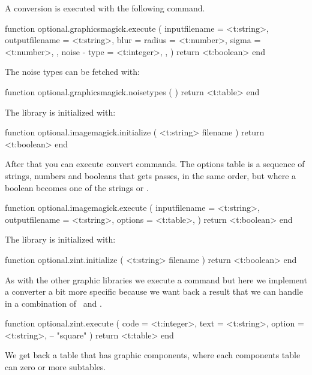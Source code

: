 A conversion is executed with the following command.

\starttyping[option=LUA]
function optional.graphicsmagick.execute (
    {
        inputfilename  = <t:string>,
        outputfilename = <t:string>,
        blur           = {
            radius = <t:number>,
            sigma  = <t:number>,
        },
        noise          - {
            type   = <t:integer>,
        },
    }
)
    return <t:boolean>
end
\stoptyping

The noise types can be fetched with:

\starttyping[option=LUA]
function optional.graphicsmagick.noisetypes ( )
    return <t:table>
end
\stoptyping

\stopsubsubsubject

\startsubsubsubject[title=imagemagick]

The  library is initialized with:

\starttyping[option=LUA]
function optional.imagemagick.initialize ( <t:string> filename )
    return <t:boolean>
end
\stoptyping

After that you can execute convert commands. The options table is a sequence of
strings, numbers and booleans that gets passes, in the same order, but where a
boolean becomes one of the strings  or .

\starttyping[option=LUA]
function optional.imagemagick.execute (
    {
        inputfilename  = <t:string>,
        outputfilename = <t:string>,
        options        = <t:table>,
    }
)
    return <t:boolean>
end
\stoptyping

\stopsubsubsubject

\startsubsubsubject[title=zint]

The  library is initialized with:

\starttyping[option=LUA]
function optional.zint.initialize ( <t:string> filename )
    return <t:boolean>
end
\stoptyping

As with the other graphic libraries we execute a command but here we implement a
converter a bit more specific because we want back a result that we can handle in
a combination of \TEX\ and \METAPOST.

\starttyping[option=LUA]
function optional.zint.execute (
    {
        code   = <t:integer>,
        text   = <t:string>,
        option = <t:string>, -- "square"
    }
)
    return <t:table>
end
\stoptyping

We get back a table that has graphic components, where each components table can
zero or more subtables.

